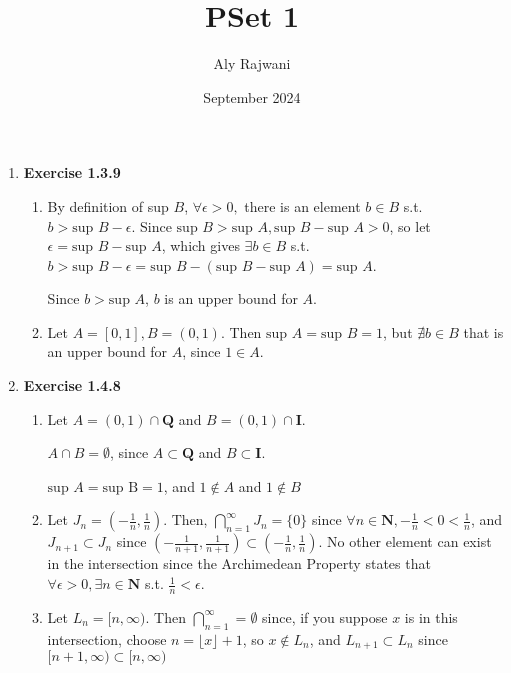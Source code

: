 \documentclass{article}
\title{PSet 1}
\author{Aly Rajwani}
\date{September 2024}
\begin{document}
\maketitle

\begin{enumerate}
    \item \textbf{Exercise 1.3.9}
        \begin{enumerate}
            \item By definition of sup $B$, $\forall \epsilon > 0,$ there is an element $b \in B$ s.t. $b > \text{sup }B - \epsilon$. Since $\text{sup }B > \text{sup }A, \text{sup }B - \text{sup }A > 0$, so let $\epsilon = \text{sup }B - \text{sup }A$, which gives $\exists b \in B$ s.t. $b > \text{sup }B - \epsilon = \text{sup }B - (\text{sup }B - \text{sup }A) = \text{sup }A$. 

            Since $b > \text{sup }A$, $b$ is an upper bound for $A$.

            \item 
            Let $A = [0, 1], B = (0, 1)$. Then $\text{sup }A = \text{sup }B = 1$, but $\nexists b \in B$ that is an upper bound for $A$, since $1 \in A$. 
        \end{enumerate}

    \item \textbf{Exercise 1.4.8}
    \begin{enumerate}
        \item Let $A = (0, 1) \cap \mathbf{Q}$ and $B = (0, 1) \cap \mathbf{I}$.

        $A \cap B = \emptyset$, since $A \subset \mathbf{Q}$ and $B \subset \mathbf{I}$.

        $\text{sup }A = \text{sup B} = 1$, and $1 \notin A$ and $1 \notin B$

        \item Let $J_n = \left( -\frac{1}{n}, \frac{1}{n}\right)$. Then, $\bigcap_{n=1}^\infty J_n = \{0\}$ since $\forall n \in \mathbf{N}, -\frac{1}{n} < 0 < \frac{1}{n}$, and $J_{n+1} \subset J_n$ since $\left(-\frac{1}{n+1}, \frac{1}{n+1}\right) \subset \left(-\frac{1}{n}, \frac{1}{n}\right)$. No other element can exist in the intersection since the Archimedean Property states that $\forall \epsilon > 0, \exists n \in \mathbf{N}$ s.t. $\frac{1}{n} < \epsilon$.

        \item Let $L_n = [n, \infty)$. Then $\bigcap_{n=1}^\infty = \emptyset$ since, if you suppose $x$ is in this intersection, choose $n = \lfloor x \rfloor + 1$, so $x \notin L_n$, and $L_{n+1} \subset L_n$ since $[n+1, \infty) \subset [n, \infty)$


\end{enumerate}
\end{enumerate}
\end{document}
